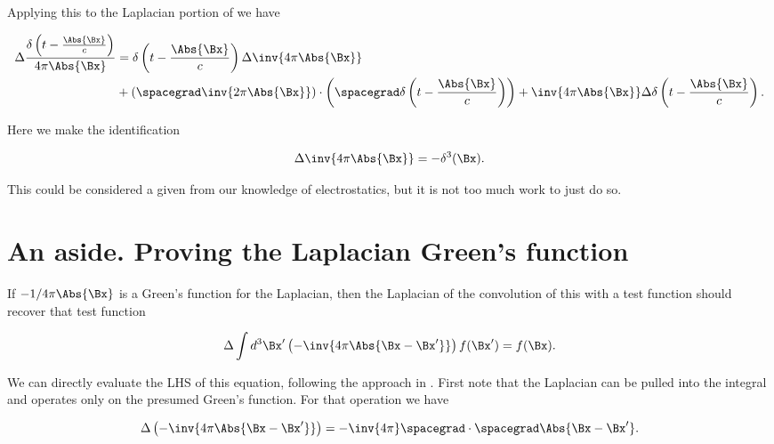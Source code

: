 Applying this to the Laplacian portion of  we have

\begin{equation}\label{eqn:relativisticElectrodynamicsL18:131}
\begin{aligned}
\Delta \frac{\delta\left(t - \frac{\Abs{\Bx}}{c}\right)}{4 \pi \Abs{\Bx} } 
&=
\delta\left(t - \frac{\Abs{\Bx}}{c}\right)
\Delta
\inv{4 \pi \Abs{\Bx} } \\
&+\left(\spacegrad \inv{2 \pi \Abs{\Bx} }\right)
\cdot
\left(
\spacegrad
\delta\left(t - \frac{\Abs{\Bx}}{c}\right) \right)
+
\inv{4 \pi \Abs{\Bx} }
\Delta
\delta\left(t - \frac{\Abs{\Bx}}{c}\right).
\end{aligned}
\end{equation}

Here we make the identification

\begin{equation}\label{eqn:relativisticElectrodynamicsL18:132}
\Delta \inv{4 \pi \Abs{\Bx} } = - \delta^3(\Bx).
\end{equation}

This could be considered a given from our knowledge of electrostatics, but it is not too much work to just do so.

\section{An aside.  Proving the Laplacian Green's function}

If $-1/{4 \pi \Abs{\Bx} }$ is a Green's function for the Laplacian, then the Laplacian of the convolution of this with a test function should recover that test function

\begin{equation}\label{eqn:relativisticElectrodynamicsL18:133}
\Delta \int d^3 \Bx' \left(-\inv{4 \pi \Abs{\Bx - \Bx'} } \right) f(\Bx') = f(\Bx).
\end{equation}

We can directly evaluate the LHS of this equation, following the approach in \citep{schwartz1987pe}.  First note that the Laplacian can be pulled into the integral and operates only on the presumed Green's function.  For that operation we have

\begin{equation}\label{eqn:relativisticElectrodynamicsL18:134}
\Delta \left(-\inv{4 \pi \Abs{\Bx - \Bx'} } \right)
=
-\inv{4 \pi} \spacegrad \cdot \spacegrad \Abs{\Bx - \Bx'}.
\end{equation}

